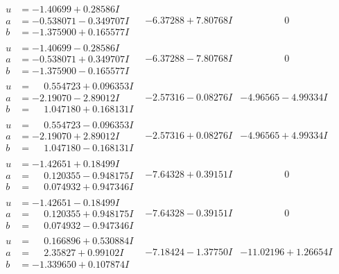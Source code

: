\documentclass[1p]{elsarticle_modified}
\theoremstyle{definition}
\begin{document}
$$\begin{array}{c|c|c}
\begin{aligned}
u &= -1.40699 + 0.28586 I \\
a &= -0.538071 - 0.349707 I \\
b &= -1.375900 + 0.165577 I\end{aligned}
 & -6.37288 + 7.80768 I & \phantom{-0.000000 } 0 \\ \hline\begin{aligned}
u &= -1.40699 - 0.28586 I \\
a &= -0.538071 + 0.349707 I \\
b &= -1.375900 - 0.165577 I\end{aligned}
 & -6.37288 - 7.80768 I & \phantom{-0.000000 } 0 \\ \hline\begin{aligned}
u &= \phantom{-}0.554723 + 0.096353 I \\
a &= -2.19070 - 2.89012 I \\
b &= \phantom{-}1.047180 + 0.168131 I\end{aligned}
 & -2.57316 - 0.08276 I & -4.96565 - 4.99334 I \\ \hline\begin{aligned}
u &= \phantom{-}0.554723 - 0.096353 I \\
a &= -2.19070 + 2.89012 I \\
b &= \phantom{-}1.047180 - 0.168131 I\end{aligned}
 & -2.57316 + 0.08276 I & -4.96565 + 4.99334 I \\ \hline\begin{aligned}
u &= -1.42651 + 0.18499 I \\
a &= \phantom{-}0.120355 - 0.948175 I \\
b &= \phantom{-}0.074932 + 0.947346 I\end{aligned}
 & -7.64328 + 0.39151 I & \phantom{-0.000000 } 0 \\ \hline\begin{aligned}
u &= -1.42651 - 0.18499 I \\
a &= \phantom{-}0.120355 + 0.948175 I \\
b &= \phantom{-}0.074932 - 0.947346 I\end{aligned}
 & -7.64328 - 0.39151 I & \phantom{-0.000000 } 0 \\ \hline\begin{aligned}
u &= \phantom{-}0.166896 + 0.530884 I \\
a &= \phantom{-}2.35827 + 0.99102 I \\
b &= -1.339650 + 0.107874 I\end{aligned}
 & -7.18424 - 1.37750 I & -11.02196 + 1.26654 I \\ \hline\begin{aligned}

\end{aligned}
\end{array}$$
\end{document}

